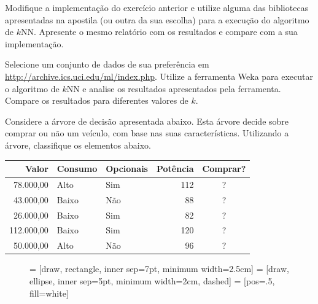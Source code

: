 \begin{exercise}
Modifique a implementação do exercício anterior e utilize alguma das bibliotecas apresentadas na apostila (ou outra da sua escolha) para a execução do algoritmo de $k$NN. Apresente o mesmo relatório com os resultados e compare com a sua implementação.
\end{exercise}

\begin{exercise}
Selecione um conjunto de dados de sua preferência em \url{http://archive.ics.uci.edu/ml/index.php}. Utilize a ferramenta Weka para executar o algoritmo de $k$NN e analise os resultados apresentados pela ferramenta. Compare os resultados para diferentes valores de $k$.
\end{exercise}

\begin{exercise}
Considere a árvore de decisão apresentada abaixo. Esta árvore decide sobre comprar ou não um veículo, com base nas suas características. Utilizando a árvore, classifique os elementos abaixo.

\begin{table}[h]
	\centering
	\begin{tabular}{rllrc}
		\hline
		\textbf{Valor} & \textbf{Consumo} & \textbf{Opcionais} & \textbf{Potência} & \textbf{Comprar?} \\ \hline
		     78.000,00 & Alto             & Sim                &               112 &         ?         \\
		     43.000,00 & Baixo            & Não                &                88 &         ?         \\
		     26.000,00 & Baixo            & Sim                &                82 &         ?         \\
		    112.000,00 & Baixo            & Sim                &               120 &         ?         \\
		     50.000,00 & Alto             & Não                &                96 &         ?         \\ \hline
	\end{tabular}
\end{table}

\begin{figure}[h]
	\centering
	 = [draw, rectangle, inner sep=7pt, minimum width=2.5cm]
	 = [draw, ellipse, inner sep=5pt, minimum width=2cm, dashed]
	 = [pos=.5, fill=white]
	
\end{figure}
\end{exercise}
